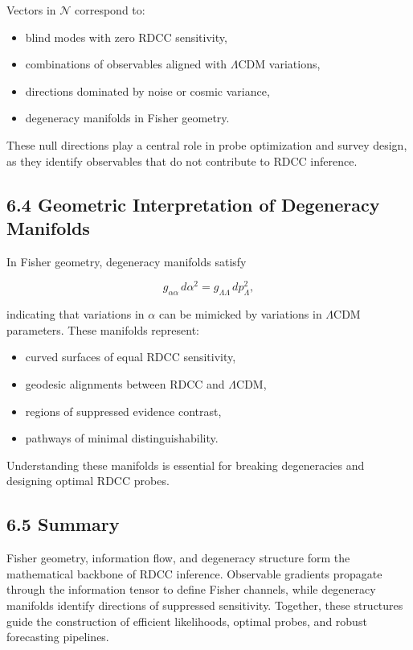 \documentclass[11pt,a4paper]{article}
\begin{document}
Vectors in $\mathcal{N}$ correspond to:

\begin{itemize}
    \item blind modes with zero RDCC sensitivity,
    \item combinations of observables aligned with $\Lambda$CDM variations,
    \item directions dominated by noise or cosmic variance,
    \item degeneracy manifolds in Fisher geometry.
\end{itemize}

These null directions play a central role in probe optimization and survey 
design, as they identify observables that do not contribute to RDCC inference.

\subsection*{6.4 Geometric Interpretation of Degeneracy Manifolds}

In Fisher geometry, degeneracy manifolds satisfy


\[
    g_{\alpha\alpha} \, d\alpha^{2}
    =
    g_{\Lambda\Lambda} \, dp_{\Lambda}^{2},
\]


indicating that variations in $\alpha$ can be mimicked by variations in 
$\Lambda$CDM parameters. These manifolds represent:

\begin{itemize}
    \item curved surfaces of equal RDCC sensitivity,
    \item geodesic alignments between RDCC and $\Lambda$CDM,
    \item regions of suppressed evidence contrast,
    \item pathways of minimal distinguishability.
\end{itemize}

Understanding these manifolds is essential for breaking degeneracies and 
designing optimal RDCC probes.

\subsection*{6.5 Summary}

Fisher geometry, information flow, and degeneracy structure form the 
mathematical backbone of RDCC inference. Observable gradients propagate through 
the information tensor to define Fisher channels, while degeneracy manifolds 
identify directions of suppressed sensitivity. Together, these structures guide 
the construction of efficient likelihoods, optimal probes, and robust 
forecasting pipelines.
\end{document}
